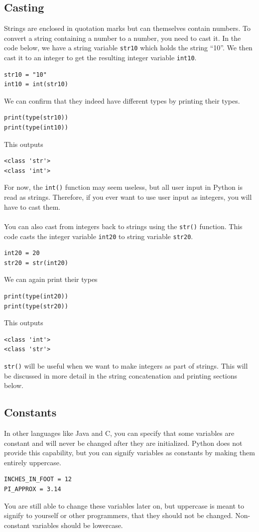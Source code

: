 \documentclass{article}
\begin{document}
\subsection{Casting}
Strings are enclosed in quotation marks but can themselves contain numbers. To convert a string containing a number to a number, you need to cast it. In the code below, we have a string variable \texttt{str10} which holds the string ``10''. We then cast it to an integer to get the resulting integer variable \texttt{int10}.
\begin{verbatim}
str10 = "10"
int10 = int(str10)
\end{verbatim}
We can confirm that they indeed have different types by printing their types.
\begin{verbatim}
print(type(str10))
print(type(int10))
\end{verbatim}
This outputs
\begin{verbatim}
<class 'str'>
<class 'int'>
\end{verbatim}
For now, the \texttt{int()} function may seem useless, but all user input in Python is read as strings. Therefore, if you ever want to use user input as integers, you will have to cast them.\\\\
You can also cast from integers back to strings using the \texttt{str()} function. This code casts the integer variable \texttt{int20} to string variable \texttt{str20}. 
\begin{verbatim}
int20 = 20
str20 = str(int20)
\end{verbatim}
We can again print their types
\begin{verbatim}
print(type(int20))
print(type(str20))
\end{verbatim}
This outputs
\begin{verbatim}
<class 'int'>
<class 'str'>
\end{verbatim}
\texttt{str()} will be useful when we want to make integers as part of strings. This will be discussed in more detail in the string concatenation and printing sections below.

\subsection{Constants}
In other languages like Java and C, you can specify that some variables are constant and will never be changed after they are initialized. Python does not provide this capability, but you can signify variables as constants by making them entirely uppercase.
\begin{verbatim}
INCHES_IN_FOOT = 12
PI_APPROX = 3.14
\end{verbatim}
You are still able to change these variables later on, but uppercase is meant to signify to yourself or other programmers, that they should not be changed. Non-constant variables should be lowercase.
\end{document}
